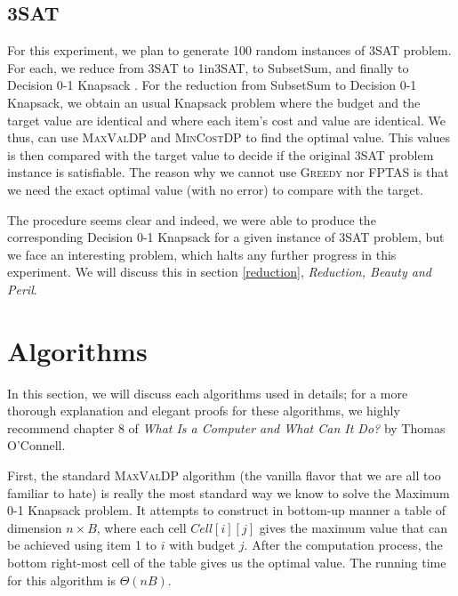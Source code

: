 \documentclass[12pt, oneside]{book}
\begin{document}
\section{3SAT}\label{sat}

For this experiment, we plan to generate 100 random instances of 3SAT
problem. For each, we reduce from 3SAT to 1in3SAT, to SubsetSum, and
finally to Decision 0-1 Knapsack \citep{oconnell2013}. For the reduction
from SubsetSum to Decision 0-1 Knapsack, we obtain an usual Knapsack
problem where the budget and the target value are identical and where
each item's cost and value are identical. We thus, can use
\textsc{MaxValDP} and \textsc{MinCostDP} to find the optimal value. This
values is then compared with the target value to decide if the original
3SAT problem instance is satisfiable. The reason why we cannot use
\textsc{Greedy} nor \textsc{FPTAS} is that we need the exact optimal
value (with no error) to compare with the target.

The procedure seems clear and indeed, we were able to produce the
corresponding Decision 0-1 Knapsack for a given instance of 3SAT
problem, but we face an interesting problem, which halts any further
progress in this experiment. We will discuss this in section
\ref{reduction}, \emph{Reduction, Beauty and Peril}.

\chapter{Algorithms}\label{algorithms}

In this section, we will discuss each algorithms used in details; for a
more thorough explanation and elegant proofs for these algorithms, we
highly recommend chapter 8 of \emph{What Is a Computer and What Can It
Do?} by Thomas O'Connell.

First, the standard \textsc{MaxValDP} algorithm (the vanilla flavor that
we are all too familiar to hate) is really the most standard way we know
to solve the Maximum 0-1 Knapsack problem. It attempts to construct in
bottom-up manner a table of dimension \(n \times B\), where each cell
\(Cell[i][j]\) gives the maximum value that can be achieved using item 1
to \(i\) with budget \(j\). After the computation process, the bottom
right-most cell of the table gives us the optimal value. The running
time for this algorithm is \(\Theta(nB)\).
\end{document}
